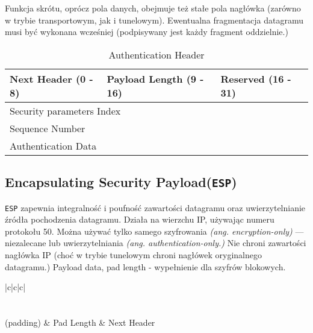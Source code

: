 \documentclass[a4paper]{article}
\begin{document}
Funkcja skrótu, oprócz pola danych, obejmuje też stałe pola nagłówka (zarówno w trybie transportowym,
jak i tunelowym). Ewentualna fragmentacja datagramu musi być wykonana wcześniej (podpisywany jest
każdy fragment oddzielnie.)

\begin{table}
  \begin{tabular}{@{}lll@{}}
    \toprule
    \multicolumn{1}{|l|}{Next Header (0 - 8)} & \multicolumn{1}{l|}{Payload Length (9 - 16)} & \multicolumn{1}{l|}{Reserved (16 - 31)} \\ \midrule
    \multicolumn{3}{|l|}{Security parameters Index} \\ \midrule
    \multicolumn{3}{|l|}{Sequence Number} \\ \midrule
    \multicolumn{3}{|l|}{Authentication Data} \\ \bottomrule
  \end{tabular}
  \caption{Authentication Header}
  \label{AH}
\end{table}

\subsection{Encapsulating Security Payload({\tt ESP})}

{\tt ESP} zapewnia integralność i poufność zawartości datagramu oraz uwierzytelnianie źródła pochodzenia datagramu.
Działa na wierzchu IP, używając numeru protokołu 50.
Można używać tylko samego szyfrowania \emph{(ang. encryption-only)} --- niezalecane lub uwierzytelniania \emph{(ang. authentication-only.)}
Nie chroni zawartości nagłówka IP (choć w trybie tunelowym chroni nagłówek oryginalnego datagramu.)
Payload data, pad length - wypełnienie dla szyfrów blokowych.

\begin{table}
  \begin{tabular}{|c|c|c|}
    \hline
     \\ \hline
     \\ \hline
     \\  
    (padding) & Pad Length & Next Header \\ \hline
   \\ \hline
  \end{tabular}
  \caption{Encapsulating Security Payload}
  \label{ESP}
\end{table}
\pagebreak
\end{document}
